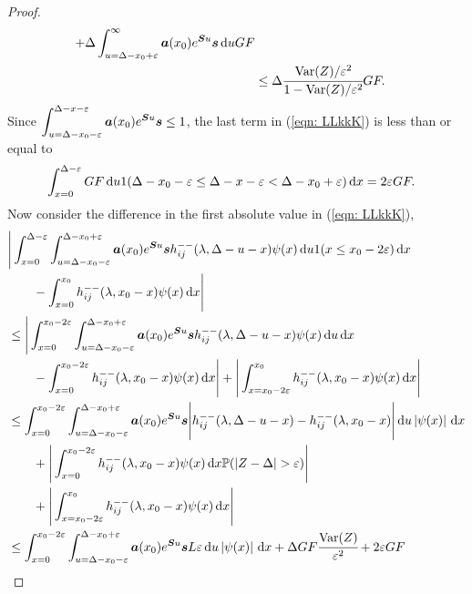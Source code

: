 \begin{proof}
\begin{align}
		+ \Delta \int_{u=\Delta-x_0+\varepsilon}^{\infty} \boldsymbol a (x_0)e^{\boldsymbol Su}\boldsymbol s  \, \mathrm{d} u GF \nonumber
		\\&\leq \Delta \cfrac{\mathrm{Var}(Z)/\varepsilon^2}{1-\mathrm{Var}(Z)/\varepsilon^2}GF. \label{eqn:aaAAAAd}
	\end{align}
	Since \(\displaystyle \int_{u=\Delta-x_0-\varepsilon}^{\Delta-x-\varepsilon} \boldsymbol a (x_0)e^{\boldsymbol Su}\boldsymbol s \leq 1\), the last term in (\ref{eqn: LLkkK}) is less than or equal to 
	\begin{align}
		&\int_{x=0}^{\Delta-\varepsilon}GF \, \mathrm{d} u 
		 1(\Delta-x_0-\varepsilon\leq \Delta - x -\varepsilon < \Delta-x_0+\varepsilon)\, \mathrm{d} x =2\varepsilon GF. \label{eqn:Qwe}
	\end{align}
	Now consider the difference in the first absolute value in (\ref{eqn: LLkkK}),
	\begin{align}
		&\Bigg|\int_{x=0}^{\Delta-\varepsilon}\int_{u=\Delta-x_0-\varepsilon}^{\Delta-x_0+\varepsilon} \bs a (x_0)e^{\bs Su}\bs s h_{ij}^{--}(\lambda, \Delta - u - x) \psi(x) \wrt u 1(x\leq x_0-2\varepsilon) \wrt x \nonumber
		\\&{}\qquad {} - \int_{x=0}^{x_0} h_{ij}^{--}(\lambda, x_0 - x)\psi(x)\wrt x \Bigg|\nonumber
		\\&\leq \Bigg|\int_{x=0}^{ x_0-2\varepsilon }\int_{u=\Delta-x_0-\varepsilon}^{\Delta-x_0+\varepsilon} \bs a (x_0)e^{\bs Su}\bs s h_{ij}^{--}(\lambda, \Delta - u - x) \psi(x) \wrt u  \wrt x \nonumber
		\\&{}\qquad {} - \int_{x=0}^{x_0-2\varepsilon} h_{ij}^{--}(\lambda, x_0 - x)\psi(x)\wrt x\Bigg| + \Bigg| \int_{x=x_0-2\varepsilon}^{x_0} h_{ij}^{--}(\lambda, x_0 - x)\psi(x)\wrt x\Bigg| \nonumber
		\\&\leq  \int_{x=0}^{ x_0-2\varepsilon }\int_{u=\Delta-x_0-\varepsilon}^{\Delta-x_0+\varepsilon} \bs a (x_0)e^{\bs Su}\bs s \Bigg| h_{ij}^{--}(\lambda, \Delta - u - x) - h_{ij}^{--}(\lambda, x_0 - x) \Bigg| \wrt u \left|\psi(x)\right| \wrt x  \nonumber
		\\&{}\qquad {} + \Bigg| \int_{x=0}^{x_0-2\varepsilon} h_{ij}^{--}(\lambda, x_0 - x)\psi(x) \wrt x \mathbb P(|Z-\Delta|>\varepsilon)\Bigg| \nonumber 
		\\&\qquad{} + \Bigg|\int_{x=x_0-2\varepsilon}^{x_0} h_{ij}^{--}(\lambda, x_0 - x)\psi(x)\wrt x \Bigg| \nonumber
		\\&\leq \int_{x=0}^{ x_0-2\varepsilon }\int_{u=\Delta-x_0-\varepsilon}^{\Delta-x_0+\varepsilon} \bs a (x_0)e^{\bs Su}\bs s L\varepsilon  \wrt u \left|\psi(x)\right| \wrt x \nonumber
		+\Delta GF \cfrac{\var(Z)}{\varepsilon^2} + 2\varepsilon GF

\end{align}
\end{proof}
